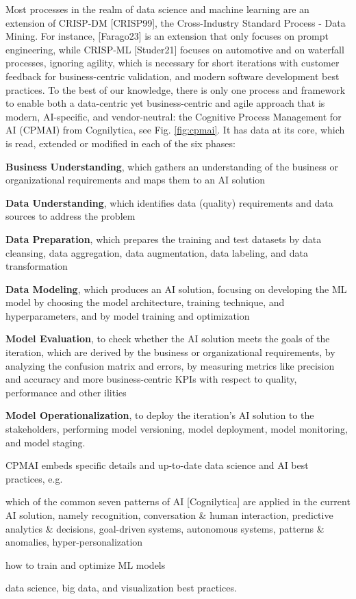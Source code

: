 \documentclass[twocolumn]{article}
\begin{document}
Most processes in the realm of data science and machine learning are an extension of CRISP-DM [CRISP99], the Cross-Industry Standard Process - Data Mining. For instance, [Farago23] is an extension that only focuses on prompt engineering, while CRISP-ML [Studer21] focuses on automotive and on waterfall processes, ignoring agility, which is necessary for short iterations with customer feedback for business-centric validation, and modern software development best practices. To the best of our knowledge, there is only one process and framework to enable both a data-centric yet business-centric and agile approach that is modern, AI-specific, and vendor-neutral: the Cognitive Process Management for AI (CPMAI) from Cognilytica, see Fig. \ref{fig:cpmai}. It has data at its core, which is read, extended or modified in each of the six phases:
\begin{compactitem}
\item {\bfseries Business Understanding}, which gathers an understanding of the business or organizational requirements and maps them to an AI solution
\item {\bfseries Data Understanding}, which identifies data (quality) requirements and data sources to address the problem
\item {\bfseries Data Preparation}, which prepares the training and test datasets by data cleansing, data aggregation, data augmentation, data labeling, and data transformation
\item {\bfseries Data Modeling}, which produces an AI solution, focusing on developing the ML model by choosing the model architecture, training technique, and hyperparameters, and by model training and optimization
\item {\bfseries Model Evaluation}, to check whether the AI solution meets the goals of the iteration, which are derived by the business or organizational requirements, by analyzing the confusion matrix and errors, by measuring metrics like precision and accuracy and more business-centric KPIs with respect to quality, performance and other ilities
\item {\bfseries Model Operationalization}, to deploy the iteration’s AI solution to the stakeholders, performing model versioning, model deployment, model monitoring, and model staging.
\end{compactitem}

CPMAI embeds specific details and up-to-date data science and AI best practices, e.g.
\begin{compactitem}
\item which of the common seven patterns of AI [Cognilytica] are applied in the current AI solution, namely recognition, conversation \& human interaction, predictive analytics \& decisions, goal-driven systems, autonomous systems, patterns \& anomalies, hyper-personalization
\item how to train and optimize ML models
\item data science, big data, and visualization best practices.
\end{compactitem}
\end{document}
